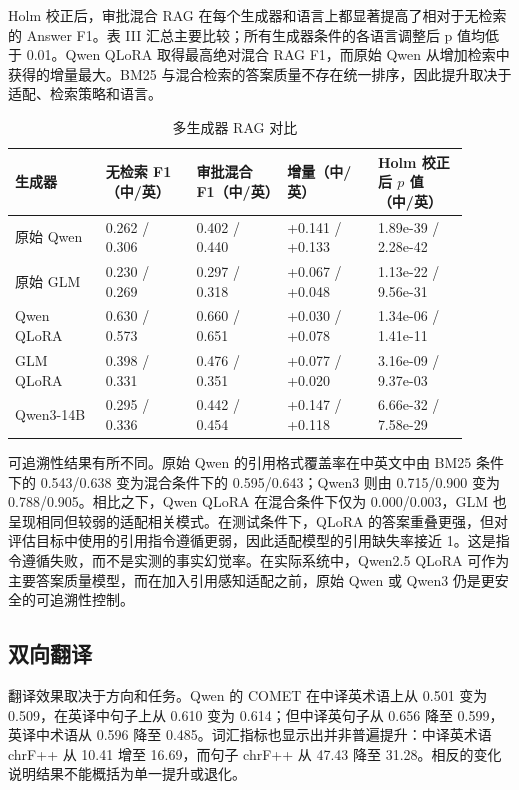 Holm 校正后，审批混合 RAG 在每个生成器和语言上都显著提高了相对于无检索的 Answer F1。表 III 汇总主要比较；所有生成器条件的各语言调整后 p 值均低于 0.01。Qwen QLoRA 取得最高绝对混合 RAG F1，而原始 Qwen 从增加检索中获得的增量最大。BM25 与混合检索的答案质量不存在统一排序，因此提升取决于适配、检索策略和语言。

\begin{table}[ht]
\centering
\caption{多生成器 RAG 对比}
\begin{tabular}{p{0.18\linewidth}p{0.18\linewidth}p{0.18\linewidth}p{0.18\linewidth}p{0.18\linewidth}}
\toprule
生成器 & 无检索 F1（中/英） & 审批混合 F1（中/英） & 增量（中/英） & Holm 校正后 $p$ 值（中/英） \\
\midrule
原始 Qwen & 0.262 / 0.306 & 0.402 / 0.440 & +0.141 / +0.133 & 1.89e-39 / 2.28e-42 \\
原始 GLM & 0.230 / 0.269 & 0.297 / 0.318 & +0.067 / +0.048 & 1.13e-22 / 9.56e-31 \\
Qwen QLoRA & 0.630 / 0.573 & 0.660 / 0.651 & +0.030 / +0.078 & 1.34e-06 / 1.41e-11 \\
GLM QLoRA & 0.398 / 0.331 & 0.476 / 0.351 & +0.077 / +0.020 & 3.16e-09 / 9.37e-03 \\
Qwen3-14B & 0.295 / 0.336 & 0.442 / 0.454 & +0.147 / +0.118 & 6.66e-32 / 7.58e-29 \\
\bottomrule
\end{tabular}
\end{table}

可追溯性结果有所不同。原始 Qwen 的引用格式覆盖率在中英文中由 BM25 条件下的 0.543/0.638 变为混合条件下的 0.595/0.643；Qwen3 则由 0.715/0.900 变为 0.788/0.905。相比之下，Qwen QLoRA 在混合条件下仅为 0.000/0.003，GLM 也呈现相同但较弱的适配相关模式。在测试条件下，QLoRA 的答案重叠更强，但对评估目标中使用的引用指令遵循更弱，因此适配模型的引用缺失率接近 1。这是指令遵循失败，而不是实测的事实幻觉率。在实际系统中，Qwen2.5 QLoRA 可作为主要答案质量模型，而在加入引用感知适配之前，原始 Qwen 或 Qwen3 仍是更安全的可追溯性控制。

\subsection{双向翻译}

翻译效果取决于方向和任务。Qwen 的 COMET 在中译英术语上从 0.501 变为 0.509，在英译中句子上从 0.610 变为 0.614；但中译英句子从 0.656 降至 0.599，英译中术语从 0.596 降至 0.485。词汇指标也显示出并非普遍提升：中译英术语 chrF++ 从 10.41 增至 16.69，而句子 chrF++ 从 47.43 降至 31.28。相反的变化说明结果不能概括为单一提升或退化。


